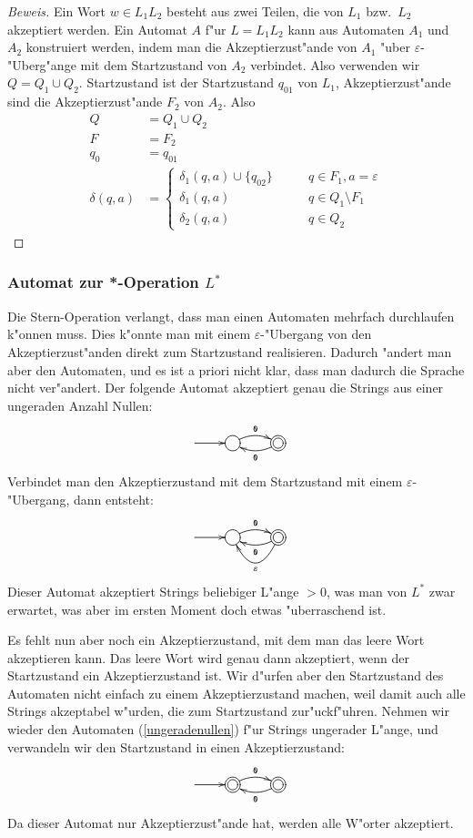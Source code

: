 \begin{proof}[Beweis]
Ein Wort $w\in L_1L_2$ besteht aus zwei Teilen, die von $L_1$
bzw.~$L_2$ akzeptiert werden. Ein Automat $A$ f"ur $L=L_1L_2$
kann aus Automaten $A_1$ und $A_2$ konstruiert werden, indem man
die Akzeptierzust"ande von $A_1$ "uber $\varepsilon$-"Uberg"ange
mit dem Startzustand von $A_2$ verbindet. Also verwenden
wir $Q=Q_1\cup Q_2$.
Startzustand ist der Startzustand $q_{01}$ von $L_1$, Akzeptierzust"ande
sind die Akzeptierzust"ande $F_2$ von $A_2$. Also
\begin{align*}
Q&=Q_1\cup Q_2\\
F&=F_2\\
q_0&=q_{01}\\
\delta(q,a)&=\begin{cases}
\delta_1(q,a)\cup\{q_{02}\}&\qquad q\in F_1, a=\varepsilon\\
\delta_1(q,a)&\qquad q\in Q_1\setminus F_1\\
\delta_2(q,a)&\qquad q\in Q_2
\end{cases}
\end{align*}
\end{proof}

\subsubsection{Automat zur *-Operation $L^*$}
Die Stern-Operation verlangt, dass man einen Automaten mehrfach
durchlaufen k"onnen muss.
Dies k"onnte man mit einem $\varepsilon$-"Ubergang
von den Akzeptierzust"anden direkt zum Startzustand realisieren.
Dadurch "andert man aber den Automaten, und es ist a priori nicht
klar, dass man dadurch die Sprache nicht ver"andert. Der folgende
Automat akzeptiert genau die Strings aus einer ungeraden Anzahl Nullen:
\begin{equation}
\entrymodifiers={++[o][F]}
\xymatrix{
*+\txt{}\ar[r]
	&{}\ar@/^/[r]^{\tt 0}
		&*++[o][F=]{}\ar@/^/[l]^{\tt 0}
}
\label{ungeradenullen}
\end{equation}
Verbindet man den Akzeptierzustand mit dem Startzustand mit einem
$\varepsilon$-"Ubergang, dann entsteht:
\[
\entrymodifiers={++[o][F]}
\xymatrix{
*+\txt{}\ar[r]
	&{}\ar@/^/[r]^{\tt 0}
		&*++[o][F=]{}\ar@/^/[l]^{\tt 0}\ar@/^20pt/[l]^{\varepsilon}
}
\]
Dieser Automat akzeptiert Strings beliebiger L"ange $>0$, was
man von $L^*$ zwar erwartet, was aber im ersten Moment doch
etwas "uberraschend ist.

Es fehlt nun aber noch ein Akzeptierzustand, mit dem man
das leere Wort akzeptieren kann. Das leere Wort wird genau
dann akzeptiert, wenn der Startzustand ein Akzeptierzustand ist.
Wir d"urfen aber den Startzustand des Automaten nicht einfach
zu einem Akzeptierzustand machen, weil damit auch alle
Strings akzeptabel w"urden, die zum Startzustand zur"uckf"uhren.
Nehmen wir wieder den Automaten (\ref{ungeradenullen}) f"ur Strings
ungerader L"ange, und verwandeln wir den Startzustand in einen
Akzeptierzustand:
\[
\entrymodifiers={++[o][F]}
\xymatrix{
*+\txt{}\ar[r]
	&*++[o][F=]{}\ar@/^/[r]^{\tt 0}
		&*++[o][F=]{}\ar@/^/[l]^{\tt 0}
}
\]
Da dieser Automat nur Akzeptierzust"ande hat, werden alle W"orter
akzeptiert.

